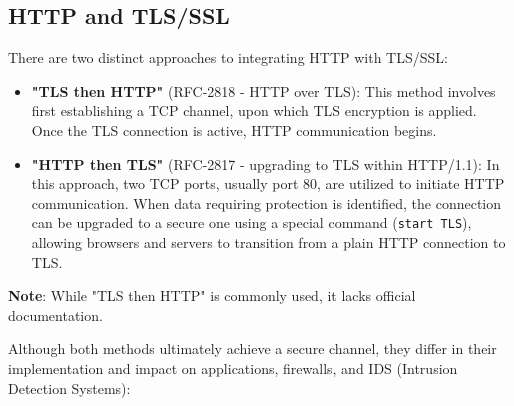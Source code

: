 \subsection{HTTP and TLS/SSL}

There are two distinct approaches to integrating HTTP with TLS/SSL:
\begin{itemize}
	\item \textbf{"TLS then HTTP"} (RFC-2818 - HTTP over TLS): This method involves first establishing a TCP channel, upon which TLS encryption is applied. Once the TLS connection is active, HTTP communication begins.

	\item \textbf{"HTTP then TLS"} (RFC-2817 - upgrading to TLS within HTTP/1.1): In this approach, two TCP ports, usually port 80, are utilized to initiate HTTP communication. When data requiring protection is identified, the connection can be upgraded to a secure one using a special command (\texttt{start TLS}), allowing browsers and servers to transition from a plain HTTP connection to TLS.
\end{itemize}
\textbf{Note}: While "TLS then HTTP" is commonly used, it lacks official documentation.


Although both methods ultimately achieve a secure channel, they differ in their implementation and impact on applications, firewalls, and IDS (Intrusion Detection Systems):

